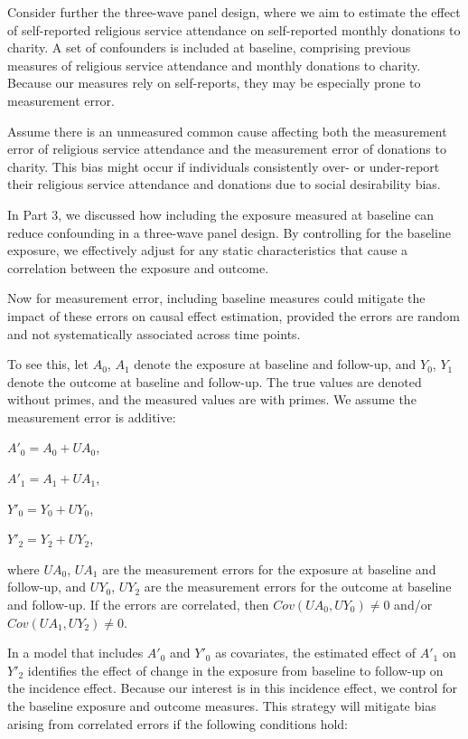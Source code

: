 \documentclass[
  singlecolumn]{article}
\begin{document}
Consider further the three-wave panel design, where we aim to estimate
the effect of self-reported religious service attendance on
self-reported monthly donations to charity. A set of confounders is
included at baseline, comprising previous measures of religious service
attendance and monthly donations to charity. Because our measures rely
on self-reports, they may be especially prone to measurement error.

Assume there is an unmeasured common cause affecting both the
measurement error of religious service attendance and the measurement
error of donations to charity. This bias might occur if individuals
consistently over- or under-report their religious service attendance
and donations due to social desirability bias.

In Part 3, we discussed how including the exposure measured at baseline
can reduce confounding in a three-wave panel design. By controlling for
the baseline exposure, we effectively adjust for any static
characteristics that cause a correlation between the exposure and
outcome.

Now for measurement error, including baseline measures could mitigate
the impact of these errors on causal effect estimation, provided the
errors are random and not systematically associated across time points.

To see this, let \(A_0\), \(A_1\) denote the exposure at baseline and
follow-up, and \(Y_0\), \(Y_1\) denote the outcome at baseline and
follow-up. The true values are denoted without primes, and the measured
values are with primes. We assume the measurement error is additive:

\(A'_0 = A_0 + UA_0\),

\(A'_1 = A_1 + UA_1\),

\(Y'_0 = Y_0 + UY_0\),

\(Y'_2 = Y_2 + UY_2\),

where \(UA_0\), \(UA_1\) are the measurement errors for the exposure at
baseline and follow-up, and \(UY_0\), \(UY_2\) are the measurement
errors for the outcome at baseline and follow-up. If the errors are
correlated, then \(Cov(UA_0, UY_0) \neq 0\) and/or
\(Cov(UA_1, UY_2) \neq 0\).

In a model that includes \(A'_0\) and \(Y'_0\) as covariates, the
estimated effect of \(A'_1\) on \(Y'_2\) identifies the effect of change
in the exposure from baseline to follow-up on the incidence effect.
Because our interest is in this incidence effect, we control for the
baseline exposure and outcome measures. This strategy will mitigate bias
arising from correlated errors if the following conditions hold:
\end{document}

